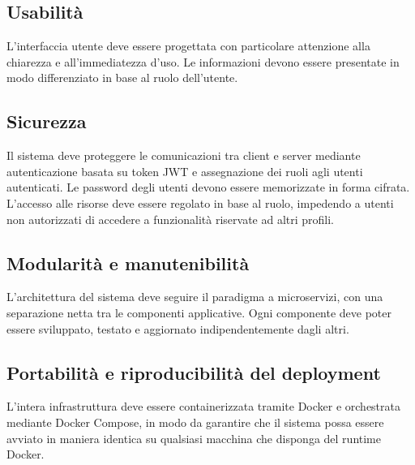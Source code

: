 \subsection{Usabilità}

L'interfaccia utente deve essere progettata con particolare attenzione alla chiarezza e all'immediatezza d'uso. Le informazioni devono essere presentate in modo differenziato in base al ruolo dell'utente.

\subsection{Sicurezza}

Il sistema deve proteggere le comunicazioni tra client e server mediante autenticazione basata su token JWT e assegnazione dei ruoli agli utenti autenticati. Le password degli utenti devono essere memorizzate in forma cifrata. L'accesso alle risorse deve essere regolato in base al ruolo, impedendo a utenti non autorizzati di accedere a funzionalità riservate ad altri profili.

\subsection{Modularità e manutenibilità}

L'architettura del sistema deve seguire il paradigma a microservizi, con una separazione netta tra le componenti applicative. Ogni componente deve poter essere sviluppato, testato e aggiornato indipendentemente dagli altri.

\subsection{Portabilità e riproducibilità del deployment}

L'intera infrastruttura deve essere containerizzata tramite Docker e orchestrata mediante Docker Compose, in modo da garantire che il sistema possa essere avviato in maniera identica su qualsiasi macchina che disponga del runtime Docker.